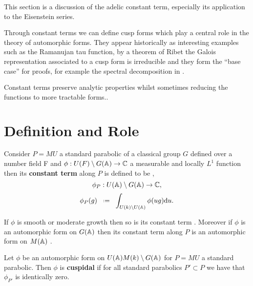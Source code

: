 This section is a discussion of the adelic constant term, especially its application to the Eisenstein series. 

Through constant terms we can define cusp forms which play a central role in the theory of automorphic forms. They appear historically as interesting examples such as the Ramanujan tau function, by a theorem of Ribet \cite[T2.3]{serreProceedingsInternationalConference1977} the Galois representation associated to a cusp form is irreducible and they form the ``base case'' for proofs, for example the spectral decomposition in \cite{moeglinSpectralDecompositionEisenstein1995}.

Constant terms preserve analytic properties whilst sometimes reducing the functions to more tractable forms..\label{constant_terms}


\section{Definition and Role} \label{cuspidal_form_definition}\label{sec:L-functions}
Consider \(P=MU\) a standard parabolic of a classical group \(G\) defined over a number field F and \(\phi: U(F)\setminus G(\A) \to \C\) a measurable and locally \(L^1\) function then its \textbf{constant term} along \(P\) is defined to be \cite[I.2.6]{moeglinSpectralDecompositionEisenstein1995},
\[\phi_P :  U(\A)\setminus G(\A) \to \C,\]
\[\phi_P(g) \defeq \int_{U(k)\setminus U(\A)}\phi(ug) \mathrm{d}u.\]

If \(\phi\) is smooth or moderate growth then so is its constant term \cite[I.2.6]{moeglinSpectralDecompositionEisenstein1995}. Moreover if \(\phi\) is an automorphic form on \(G(\A)\) then its constant term along \(P\) is an automorphic form on \(M(\A)\) \cite[6.5]{getzIntroductionAutomorphicRepresentations2024}.

Let \(\phi\) be an automorphic form on \(U(\A)M(k)\setminus G(\A)\) for \(P = MU\) a standard parabolic. Then \(\phi\) is \textbf{cuspidal} if for all standard parabolics \(P'\subset P\) we have that \(\phi_{P'}\) is identically zero. 

